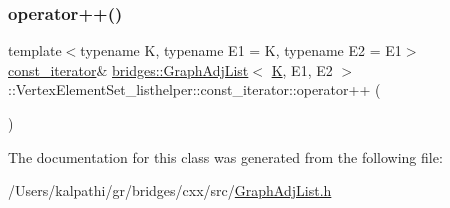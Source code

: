 \mbox{\label{classbridges_1_1_graph_adj_list_1_1_vertex_element_set__listhelper_1_1const__iterator_a44523a95bdf756876509aef9fb79db73}} 
\subsubsection{\texorpdfstring{operator++()}{operator++()}}
{\footnotesize\ttfamily template$<$typename K, typename E1 = K, typename E2 = E1$>$ \\
\mbox{\hyperlink{classbridges_1_1_graph_adj_list_1_1_vertex_element_set__listhelper_1_1const__iterator}{const\+\_\+iterator}}\& \mbox{\hyperlink{classbridges_1_1_graph_adj_list}{bridges\+::\+Graph\+Adj\+List}}$<$ \mbox{\hyperlink{namespacebridges_acfb0a4f7877d8f63de3e6862004c50edaa5f3c6a11b03839d46af9fb43c97c188}{K}}, E1, E2 $>$\+::Vertex\+Element\+Set\+\_\+listhelper\+::const\+\_\+iterator\+::operator++ (\begin{DoxyParamCaption}{ }\end{DoxyParamCaption})\hspace{0.3cm}{\ttfamily [inline]}}



The documentation for this class was generated from the following file\+:\begin{DoxyCompactItemize}
\item 
/\+Users/kalpathi/gr/bridges/cxx/src/\mbox{\hyperlink{_graph_adj_list_8h}{Graph\+Adj\+List.\+h}}\end{DoxyCompactItemize}
